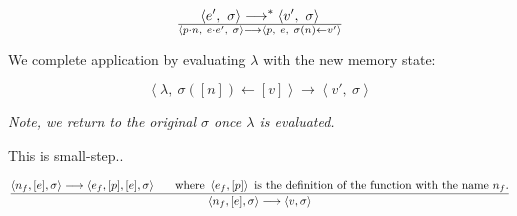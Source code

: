 \begin{equation}
{
\left\langle e',\ \sigma\right\rangle
\longrightarrow^*
\left\langle v',\ \sigma\right\rangle
}\over{
\left\langle p\cdot n,\ e\cdot e',\ \sigma\right\rangle
\longrightarrow
\left\langle p,\ e,\ \sigma(n)\leftarrow v' \right\rangle
}
\end{equation}




We complete application by evaluating $\lambda$ with the new memory state:

\begin{equation}
\left\langle \lambda,\ \sigma([n])\leftarrow[v]\right\rangle
\longrightarrow
\left\langle v',\ \sigma\right\rangle
\end{equation}

\emph{Note, we return to the original $\sigma$ once $\lambda$ is evaluated.}

\newpage

This is small-step..

\begin{equation}
{
\left\langle n_f, [e], \sigma\right\rangle
\longrightarrow
\left\langle e_f, [p], [e], \sigma\right\rangle
\ \ \ \ \ \text{where}\ \left\langle e_f, [p] \right\rangle
\ \text{is the definition of the function with the name}\ n_f\text{.}
\over
\left\langle n_f, [e], \sigma\right\rangle
\longrightarrow
\left\langle v, \sigma\right\rangle
}
\end{equation}
